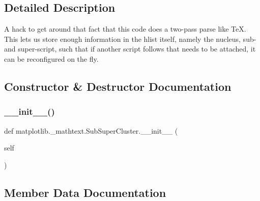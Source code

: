 \subsection{Detailed Description}
\begin{DoxyVerb}A hack to get around that fact that this code does a two-pass parse like
TeX.  This lets us store enough information in the hlist itself, namely the
nucleus, sub- and super-script, such that if another script follows that
needs to be attached, it can be reconfigured on the fly.
\end{DoxyVerb}
 

\subsection{Constructor \& Destructor Documentation}
\mbox{\label{classmatplotlib_1_1__mathtext_1_1SubSuperCluster_a2b6f38fcb25502a8dfe6292b3d42ac65}} 
\subsubsection{\texorpdfstring{\+\_\+\+\_\+init\+\_\+\+\_\+()}{\_\_init\_\_()}}
{\footnotesize\ttfamily def matplotlib.\+\_\+mathtext.\+Sub\+Super\+Cluster.\+\_\+\+\_\+init\+\_\+\+\_\+ (\begin{DoxyParamCaption}\item[{}]{self }\end{DoxyParamCaption})}



\subsection{Member Data Documentation}
\mbox{\label{classmatplotlib_1_1__mathtext_1_1SubSuperCluster_a3df0c434b5aefd36ee37e8ce18899fd4}} 
